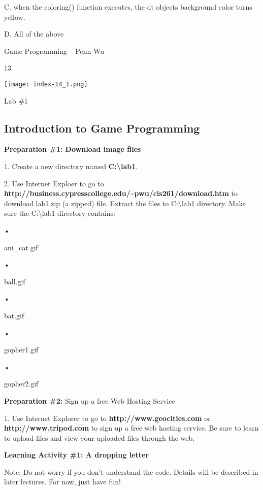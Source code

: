 \documentclass[
]{article}
\begin{document}
C. when the coloring() function executes, the dt
object\textquotesingle s background color turns yellow.

D. All of the above

Game Programming -- Penn Wu

13

\protect\hypertarget{index_split_001.htmlux5cux23p14}{}{}\texttt{[image: index-14\_1.png]}

\textbf{}

Lab \#1

\protect\hypertarget{index_split_002.html}{}{}

\hypertarget{index_split_002.htmlux5cux23calibre_pb_1}{%
\subsection{Introduction to Game
Programming}\label{index_split_002.htmlux5cux23calibre_pb_1}}

\textbf{}

\textbf{Preparation \#1: Download image files}

1. Create a new directory named \textbf{C:\textbackslash lab1}.

2. Use Internet Exploer to go to
\textbf{http://business.cypresscollege.edu/\textasciitilde pwu/cis261/download.htm}
to download lab1.zip (a zipped) file. Extract the files to
C:\textbackslash lab1 directory. Make sure the C:\textbackslash lab1
directory contains:

•

ani\_cat.gif

•

ball.gif

•

bat.gif

•

gopher1.gif

•

gopher2.gif

\textbf{Preparation \#2:} Sign up a free Web Hosting Service

1. Use Internet Explorer to go to \textbf{http://www.geocities.com} or
\textbf{http://www.tripod.com} to sign up a free web hosting service. Be
sure to learn to upload files and view your uploaded files through the
web.

\textbf{Learning Activity \#1: A dropping letter}

\textbf{}

Note: Do not worry if you don't understand the code. Details will be
described in later lectures. For now, just have fun!
\end{document}
